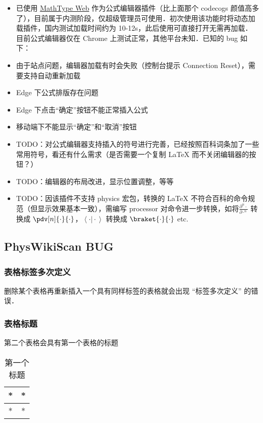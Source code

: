 \begin{itemize}
\item 已使用 \href{http://www.wiris.net/client/editor/resources/help.html?v=7.9.0.6564}{MathType Web} 作为公式编辑器插件（比上面那个 codecogs 颜值高多了），目前属于内测阶段，仅超级管理员可使用．初次使用该功能时将动态加载插件，国内测试加载时间约为 10-12s，此后使用可直接打开无需再加载．
目前公式编辑器仅在 Chrome 上测试正常，其他平台未知．已知的 bug 如下：
\item 由于站点问题，编辑器加载有时会失败（控制台提示 Connection Reset），需要支持自动重新加载
\item Edge 下公式排版存在问题
\item Edge 下点击“确定”按钮不能正常插入公式
\item 移动端下不能显示“确定”和“取消”按钮
\item TODO：对公式编辑器支持插入的符号进行完善，已经按照百科词条加了一些常用符号，看还有什么需求（是否需要一个复制 LaTeX 而不关闭编辑器的按钮？）
\item TODO：编辑器的布局改进，显示位置调整，等等
\item TODO：因该插件不支持 physics 宏包，转换的 LaTeX 不符合百科的命令规范（但显示效果基本一致），需编写 processor 对命令进一步转换，如将$\frac{\partial^{n}{\cdot}}{\partial{\cdot}^{n}}$ 转换成 $\pdv[n]{\cdot}{\cdot}$，$\left\langle{\cdot}\vert{\cdot}\right\rangle$ 转换成 $\braket{\cdot}{\cdot}$ etc.

\end{itemize}

\subsection{PhysWikiScan BUG}

\subsubsection{表格标签多次定义}
删除某个表格再重新插入一个具有同样标签的表格就会出现 “标签多次定义” 的错误．

\subsubsection{表格标题}
第二个表格会具有第一个表格的标题
\begin{table}[ht]
\centering
\caption{第一个标题}\label{edTODO_tab2}
\begin{tabular}{|c|c|}
\hline
* & * \\
\hline
* & * \\
\hline
\end{tabular}
\end{table}

